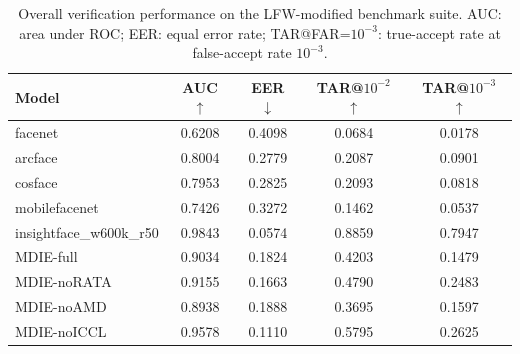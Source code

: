 \begin{table}[t]
\centering
\caption{Overall verification performance on the LFW-modified benchmark suite. AUC: area under ROC; EER: equal error rate; TAR@FAR=$10^{-3}$: true-accept rate at false-accept rate $10^{-3}$.}
\label{tab:overall}
\begin{tabular}{lcccc}
\hline
Model & AUC $\uparrow$ & EER $\downarrow$ & TAR@$10^{-2}$ $\uparrow$ & TAR@$10^{-3}$ $\uparrow$ \\
\hline
facenet & 0.6208 & 0.4098 & 0.0684 & 0.0178 \\
arcface & 0.8004 & 0.2779 & 0.2087 & 0.0901 \\
cosface & 0.7953 & 0.2825 & 0.2093 & 0.0818 \\
mobilefacenet & 0.7426 & 0.3272 & 0.1462 & 0.0537 \\
insightface_w600k_r50 & 0.9843 & 0.0574 & 0.8859 & 0.7947 \\
MDIE-full & 0.9034 & 0.1824 & 0.4203 & 0.1479 \\
MDIE-noRATA & 0.9155 & 0.1663 & 0.4790 & 0.2483 \\
MDIE-noAMD & 0.8938 & 0.1888 & 0.3695 & 0.1597 \\
MDIE-noICCL & 0.9578 & 0.1110 & 0.5795 & 0.2625 \\
\hline
\end{tabular}
\end{table}

